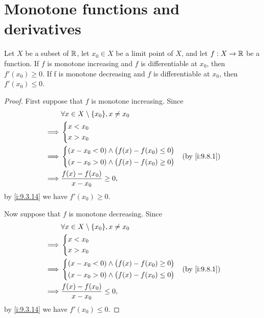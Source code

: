 \section{Monotone functions and derivatives}\label{i:sec:10.3}

\begin{prop}\label{i:10.3.1}
  Let \(X\) be a subset of \(\mathbb{R}\), let \(x_0 \in X\) be a limit point of \(X\), and let \(f : X \to \mathbb{R}\) be a function.
  If \(f\) is monotone increasing and \(f\) is differentiable at \(x_0\), then \(f'(x_0) \geq 0\).
  If f is monotone decreasing and \(f\) is differentiable at \(x_0\), then \(f'(x_0) \leq 0\).
\end{prop}

\begin{proof}
  First suppose that \(f\) is monotone increasing.
  Since
  \begin{align*}
             & \forall x \in X \setminus \set{x_0}, x \neq x_0    \\
    \implies & \begin{dcases}
                 x < x_0 \\
                 x > x_0 \\
               \end{dcases}                                      \\
    \implies & \begin{dcases}
                 (x - x_0 < 0) \land \big(f(x) - f(x_0) \leq 0\big) \\
                 (x - x_0 > 0) \land \big(f(x) - f(x_0) \geq 0\big) \\
               \end{dcases} &  & \by{i:9.8.1} \\
    \implies & \dfrac{f(x) - f(x_0)}{x - x_0} \geq 0,
  \end{align*}
  by \cref{i:9.3.14} we have \(f'(x_0) \geq 0\).

  Now suppose that \(f\) is monotone decreasing.
  Since
  \begin{align*}
             & \forall x \in X \setminus \set{x_0}, x \neq x_0    \\
    \implies & \begin{dcases}
                 x < x_0 \\
                 x > x_0 \\
               \end{dcases}                                      \\
    \implies & \begin{dcases}
                 (x - x_0 < 0) \land \big(f(x) - f(x_0) \geq 0\big) \\
                 (x - x_0 > 0) \land \big(f(x) - f(x_0) \leq 0\big) \\
               \end{dcases} &  & \by{i:9.8.1} \\
    \implies & \dfrac{f(x) - f(x_0)}{x - x_0} \leq 0,
  \end{align*}
  by \cref{i:9.3.14} we have \(f'(x_0) \leq 0\).
\end{proof}

